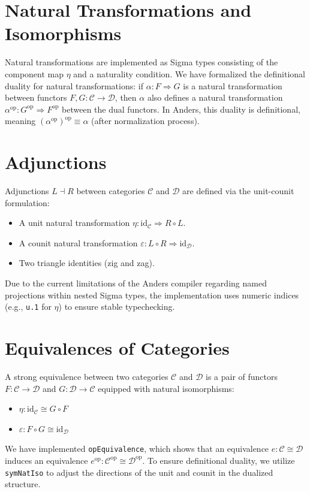 \documentclass[11pt]{article}
\newcommand{\catC}{\mathcal{C}}
\newcommand{\catD}{\mathcal{D}}
\newcommand{\op}{^\text{op}}
\begin{document}
\section{Natural Transformations and Isomorphisms}

Natural transformations are implemented as Sigma types consisting of the component map $\eta$ and a naturality condition.
We have formalized the definitional duality for natural transformations: if $\alpha : F \Rightarrow G$ is a natural
transformation between functors $F, G : \catC \to \catD$, then $\alpha$ also defines a natural transformation
$\alpha\op : G\op \Rightarrow F\op$ between the dual functors. In Anders, this duality is definitional,
meaning $(\alpha\op)\op \equiv \alpha$ (after normalization process).

\section{Adjunctions}

Adjunctions $L \dashv R$ between categories $\catC$ and $\catD$ are defined via the unit-counit formulation:
\begin{itemize}
    \item A unit natural transformation $\eta : \text{id}_\catC \Rightarrow R \circ L$.
    \item A counit natural transformation $\varepsilon : L \circ R \Rightarrow \text{id}_\catD$.
    \item Two triangle identities (zig and zag).
\end{itemize}
Due to the current limitations of the Anders compiler regarding named projections within nested Sigma types, the implementation uses numeric indices (e.g., \texttt{u.1} for $\eta$) to ensure stable typechecking.

\section{Equivalences of Categories}

A strong equivalence between two categories $\catC$ and $\catD$ is a pair of functors $F : \catC \to \catD$ and $G : \catD \to \catC$ equipped with natural isomorphisms:
\begin{itemize}
    \item $\eta : \text{id}_\catC \cong G \circ F$
    \item $\varepsilon : F \circ G \cong \text{id}_\catD$
\end{itemize}
We have implemented \texttt{opEquivalence}, which shows that an equivalence $e : \catC \cong \catD$ induces an equivalence $e\op : \catC\op \cong \catD\op$. To ensure definitional duality, we utilize \texttt{symNatIso} to adjust the directions of the unit and counit in the dualized structure.
\end{document}
